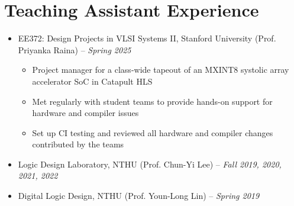 \documentclass{cvclass}
\begin{document}

\makepublications


\section{Teaching Assistant Experience}
\begin{itemize}
    \item EE372: Design Projects in VLSI Systems II, Stanford University (Prof. Priyanka Raina) -- \textit{Spring 2025}
    \begin{itemize}
        \item Project manager for a class-wide tapeout of an MXINT8 systolic array accelerator SoC in Catapult HLS
        \item Met regularly with student teams to provide hands-on support for hardware and compiler issues
        \item Set up CI testing and reviewed all hardware and compiler changes contributed by the teams
    \end{itemize}
    \item Logic Design Laboratory, NTHU (Prof. Chun-Yi Lee) -- \textit{Fall 2019, 2020, 2021, 2022}
    \item Digital Logic Design, NTHU (Prof. Youn-Long Lin) -- \textit{Spring 2019}
\end{itemize}

\end{document}
